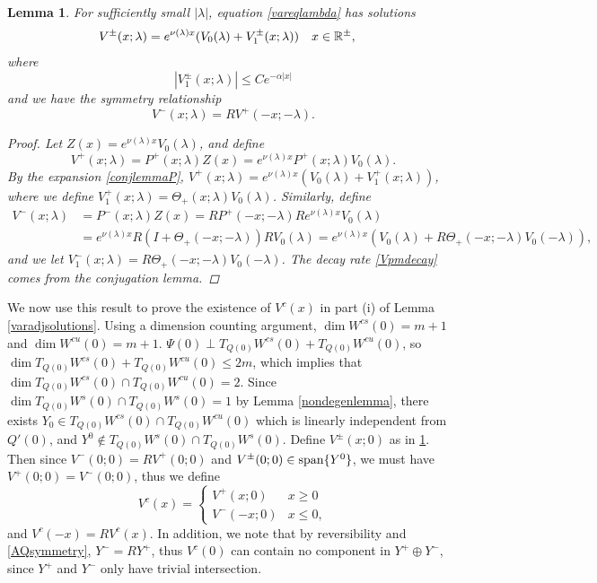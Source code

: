 \documentclass[10pt,reqno]{amsart}
\theoremstyle{plain}
\newtheorem{lemma}[theorem]{Lemma}
\theoremstyle{definition}
\theoremstyle{remark}
\numberwithin{theorem}{section}
\numberwithin{equation}{section}
\begin{document}
\begin{lemma}\label{lemma:Vpm}
For sufficiently small $|\lambda|$, equation \cref{vareqlambda} has solutions
\begin{align}\label{Vpmlambda}
V^\pm(x; \lambda) &= e^{\nu(\lambda)x}(V_0(\lambda) + V_1^\pm(x; \lambda)) && x \in \mathbb{R}^\pm,
\end{align}
where
\begin{equation}\label{Vpmdecay}
|V_1^\pm(x; \lambda)| \leq C e^{-\alpha |x|}
\end{equation}
and we have the symmetry relationship
\begin{equation}\label{Vpmsymmetry}
V^-(x; \lambda) = R V^+(-x; -\lambda).
\end{equation}
\begin{proof}
Let $Z(x) = e^{\nu(\lambda)x}V_0(\lambda)$, and define
\begin{equation}\label{defVplus}
V^+(x; \lambda) = P^+(x; \lambda) Z(x) = e^{\nu(\lambda)x}P^+(x; \lambda)V_0(\lambda).
\end{equation}
By the expansion \eqref{conjlemmaP}, $V^+(x; \lambda) = e^{\nu(\lambda)x}( V_0(\lambda) + V_1^+(x; \lambda))$, where we define $V_1^+(x; \lambda) = \Theta_+(x; \lambda) V_0(\lambda)$. Similarly, define 
\begin{align*}
V^-(x; \lambda) &= P^-(x; \lambda) Z(x) = RP^+(-x; -\lambda)R e^{\nu(\lambda)x} V_0(\lambda) \\
&= e^{\nu(\lambda)x} R(I + \Theta_+(-x; -\lambda))R V_0(\lambda) = e^{\nu(\lambda)x}( V_0(\lambda) + R\Theta_+(-x; -\lambda) V_0(-\lambda) ),
\end{align*}
and we let $V_1^-(x; \lambda) = R\Theta_+(-x; -\lambda) V_0(-\lambda)$. The decay rate \cref{Vpmdecay} comes from the conjugation lemma.
\end{proof}
\end{lemma}

We now use this result to prove the existence of $V^c(x)$ in part (i) of Lemma \ref{varadjsolutions}. Using a dimension counting argument, $\dim W^{cs}(0) = m + 1$ and $\dim W^{cu}(0) = m + 1$. $\Psi(0) \perp T_{Q(0)}W^{cs}(0) + T_{Q(0)}W^{cu}(0)$, so $\dim T_{Q(0)}W^{cs}(0) + T_{Q(0)}W^{cu}(0) \leq 2m$, which implies that $\dim T_{Q(0)}W^{cs}(0) \cap T_{Q(0)}W^{cu}(0) = 2$. Since $\dim T_{Q(0)}W^s(0) \cap T_{Q(0)}W^s(0) = 1$ by Lemma \ref{nondegenlemma}, there exists $Y_0 \in T_{Q(0)}W^{cs}(0) \cap T_{Q(0)}W^{cu}(0)$ which is linearly independent from $Q'(0)$, and $Y^0 \notin T_{Q(0)}W^s(0) \cap T_{Q(0)}W^s(0)$. Define $V^\pm(x; 0)$ as in \cref{lemma:Vpm}. Then since $V^-(0; 0) = R V^+(0; 0)$ and $V^\pm(0; 0) \in \mathop\mathrm{span}\nolimits \{Y^0 \}$, we must have $V^+(0; 0) = V^-(0; 0)$, thus we define 
\[
V^c(x) = \begin{cases}
V^+(x; 0) & x \geq 0 \\
V^-(-x; 0) & x \leq 0,
\end{cases}
\]
and $V^c(-x) = R V^c(x)$. In addition, we note that by reversibility and \cref{AQsymmetry}, $Y^- = R Y^+$, thus $V^c(0)$ can contain no component in $Y^+ \oplus Y^-$, since $Y^+$ and $Y^-$ only have trivial intersection.
\end{document}
